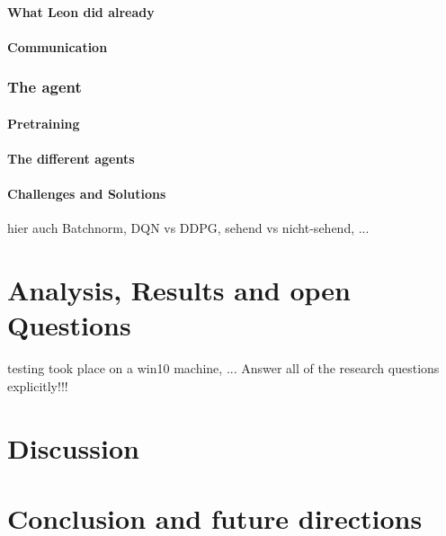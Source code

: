 \subsubsection{What Leon did already}

\subsubsection{Communication}

\subsection{The agent}

\subsubsection{Pretraining}

\subsubsection{The different agents}

\subsubsection{Challenges and Solutions}

hier auch Batchnorm, DQN vs DDPG, sehend vs nicht-sehend, ...

\chapter{Analysis, Results and open Questions}

testing took place on a win10 machine, ...
Answer all of the research questions explicitly!!!

\chapter{Discussion}

\chapter{Conclusion and future directions}





